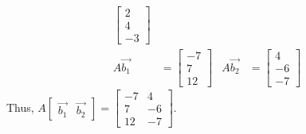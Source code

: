 \documentclass[11pt]{scrartcl}
\theoremstyle{dotlessP}
\theoremstyle{dotlessN}
\begin{document}
\begin{align*}
		\begin{bmatrix}
			2 \\
			4 \\
			-3
		\end{bmatrix} \\
			A\vec{b_1}	&= 
		\begin{bmatrix}
			-7 \\
			7 \\
			12
		\end{bmatrix}
		&
			A\vec{b_2}	&= 
		\begin{bmatrix}
			4 \\
			-6 \\
			-7
		\end{bmatrix}
\end{align*}
Thus, $A
\begin{bmatrix}
	\vec{b_1} & \vec{b_2}
\end{bmatrix}
= 
\begin{bmatrix}
	-7 & 4 \\
	7 & -6 \\
	12 & -7
\end{bmatrix}
$.
\\
\end{document}
